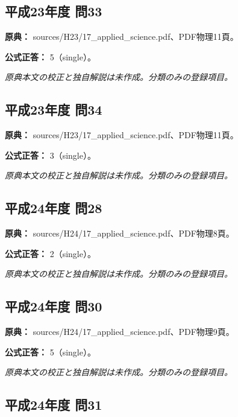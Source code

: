 \subsection{平成23年度 問33}
\label{q:h23-reg-applied-33}

\noindent\textbf{原典：} sources/H23/17\_applied\_science.pdf、PDF物理11頁。

\textbf{公式正答：} 5（single）。

\par\textit{原典本文の校正と独自解説は未作成。分類のみの登録項目。}

\subsection{平成23年度 問34}
\label{q:h23-reg-applied-34}

\noindent\textbf{原典：} sources/H23/17\_applied\_science.pdf、PDF物理11頁。

\textbf{公式正答：} 3（single）。

\par\textit{原典本文の校正と独自解説は未作成。分類のみの登録項目。}

\subsection{平成24年度 問28}
\label{q:h24-reg-applied-28}

\noindent\textbf{原典：} sources/H24/17\_applied\_science.pdf、PDF物理8頁。

\textbf{公式正答：} 2（single）。

\par\textit{原典本文の校正と独自解説は未作成。分類のみの登録項目。}

\subsection{平成24年度 問30}
\label{q:h24-reg-applied-30}

\noindent\textbf{原典：} sources/H24/17\_applied\_science.pdf、PDF物理9頁。

\textbf{公式正答：} 5（single）。

\par\textit{原典本文の校正と独自解説は未作成。分類のみの登録項目。}

\subsection{平成24年度 問31}
\label{q:h24-reg-applied-31}

